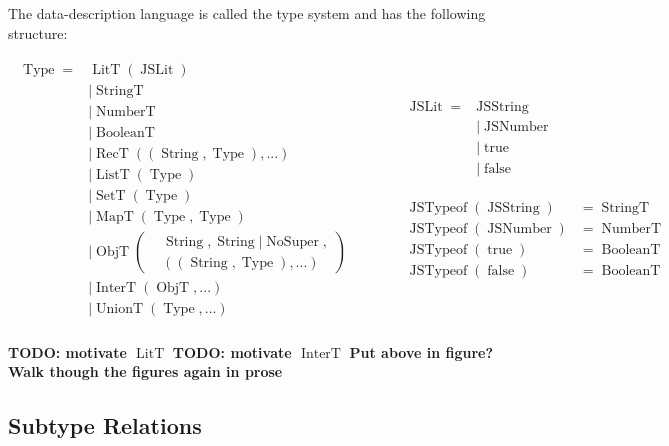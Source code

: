 \documentclass{article}
\DeclareMathOperator{\StringT}{StringT}
\DeclareMathOperator{\NumberT}{NumberT}
\DeclareMathOperator{\BooleanT}{BooleanT}
\DeclareMathOperator{\LitT}{LitT}
\DeclareMathOperator{\JSLit}{JSLit}
\DeclareMathOperator{\JSTypeof}{JSTypeof}
\DeclareMathOperator{\RecT}{RecT}
\DeclareMathOperator{\ObjT}{ObjT}
\DeclareMathOperator{\ListT}{ListT}
\DeclareMathOperator{\SetT}{SetT}
\DeclareMathOperator{\MapT}{MapT}
\DeclareMathOperator{\UnionT}{UnionT}
\DeclareMathOperator{\InterT}{InterT}
\DeclareMathOperator{\String}{String}
\DeclareMathOperator{\Type}{Type}
\DeclareMathOperator{\NoSuper}{NoSuper}
\begin{document}
The data-description language is called the type system and has 
the following structure:

\begin{align*}
\begin{aligned}
\Type = &\LitT(\JSLit) \\
&|\StringT \\
&|\NumberT \\
&|\BooleanT \\
&|\RecT((\String, \Type), ...) \\
&|\ListT(\Type) \\
&|\SetT(\Type) \\
&|\MapT(\Type, \Type) \\
&|\ObjT\left(\begin{aligned}
    &\String, \String | \NoSuper, \\
&((\String, \Type), ...)
\end{aligned}\right) \\
&|\InterT(\ObjT, ...) \\
&|\UnionT(\Type, ...)\\
\end{aligned}
\quad\quad\quad\begin{aligned}        
\begin{aligned}
\JSLit = &\operatorname{JSString} \\
&| \operatorname{JSNumber} \\
&| \operatorname{true} \\
&| \operatorname{false} \\
\end{aligned}\\\\
\begin{aligned}
\JSTypeof(\operatorname{JSString}) &= \StringT \\
\JSTypeof(\operatorname{JSNumber}) &= \NumberT \\
\JSTypeof(\operatorname{true}) &= \BooleanT \\
\JSTypeof(\operatorname{false}) &= \BooleanT \\
\end{aligned}  
\end{aligned}  
\end{align*}


\textbf{TODO: motivate \(\LitT\)}
\textbf{TODO: motivate \(\InterT\)}
\textbf{Put above in figure? Walk though the figures again in prose}

\subsection{Subtype Relations}
\end{document}
